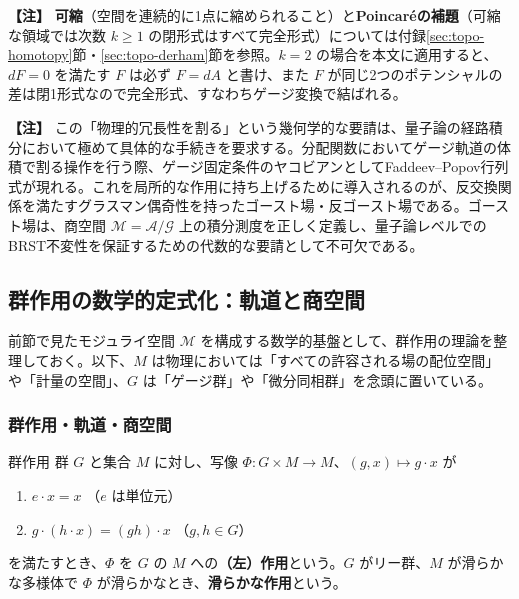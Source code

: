 \documentclass[uplatex, dvipdfmx, book]{jsbook}
\let\origsubsection\subsection
\let\origsubsubsection\subsubsection
\renewcommand{\section}{\origsubsection}
\renewcommand{\subsection}{\origsubsubsection}
\renewcommand{\subsubsection}{\paragraph}
\newenvironment{note}{\vspace{1ex}\par\footnotesize\noindent\textbf{【注】}}{\par\vspace{1ex}}
\begin{document}
\begin{note}
\textbf{可縮}（空間を連続的に1点に縮められること）と\textbf{Poincar\'eの補題}（可縮な領域では次数 $k \ge 1$ の閉形式はすべて完全形式）については付録\ref{sec:topo-homotopy}節・\ref{sec:topo-derham}節を参照。$k = 2$ の場合を本文に適用すると、$dF = 0$ を満たす $F$ は必ず $F = dA$ と書け、また $F$ が同じ2つのポテンシャルの差は閉1形式なので完全形式、すなわちゲージ変換で結ばれる。
\end{note}

\begin{note}
この「物理的冗長性を割る」という幾何学的な要請は、量子論の経路積分において極めて具体的な手続きを要求する。分配関数においてゲージ軌道の体積で割る操作を行う際、ゲージ固定条件のヤコビアンとしてFaddeev--Popov行列式が現れる。これを局所的な作用に持ち上げるために導入されるのが、反交換関係を満たすグラスマン偶奇性を持ったゴースト場・反ゴースト場である。ゴースト場は、商空間 $\mathcal{M} = \mathcal{A} / \mathcal{G}$ 上の積分測度を正しく定義し、量子論レベルでのBRST不変性を保証するための代数的な要請として不可欠である。
\end{note}


\section{群作用の数学的定式化：軌道と商空間}

前節で見たモジュライ空間 $\mathcal{M}$ を構成する数学的基盤として、群作用の理論を整理しておく。以下、$M$ は物理においては「すべての許容される場の配位空間」や「計量の空間」、$G$ は「ゲージ群」や「微分同相群」を念頭に置いている。

\subsection{群作用・軌道・商空間}

\begin{mydef}{群作用}{}
群 $G$ と集合 $M$ に対し、写像 $\Phi: G \times M \to M$、$(g, x) \mapsto g \cdot x$ が
\begin{enumerate}
    \item $e \cdot x = x$ \quad（$e$ は単位元）
    \item $g \cdot (h \cdot x) = (gh) \cdot x$ \quad（$g, h \in G$）
\end{enumerate}
を満たすとき、$\Phi$ を $G$ の $M$ への\textbf{（左）作用}という。$G$ がリー群、$M$ が滑らかな多様体で $\Phi$ が滑らかなとき、\textbf{滑らかな作用}という。
\end{mydef}
\end{document}
